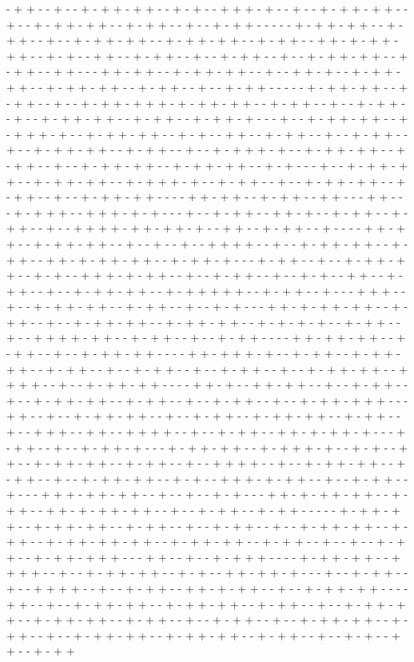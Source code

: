 - + + - - + - - + - + + - + + - - + - + - - + + + - + - - + - - + - + + - + + - - + - - + - + + - + + - - + - + + - - + - - + - + + - - - - - + - + + - + + - - + - + + - - + - - + - + + - + + - - + - + + - + + - - + - + + - - + + - + - + + - + + - - + - + - - + + - - + - + + - - + - - + - + + - - + - - + - + + - + + - - + - + + - - + + - - - + + - + + - - + - + + - + + - - + - - + + - + - - + - + + - + + - - + - + + - + + - - + - + + - - + - - + - + + - - - - - + - + + - + + - - + - + + - - + - - + - + + - + + + - + - + + - + + - - + - + + - - + - - + - + + - - + - - + - + + - + + - - + - + + - - + - + + - + - - - + - - + - + + - + + - - + - + + + - + - - + - + + - + + - - + - + - - + + - - + - + + - - + - - + - + + - - + - - + - + + - + + - - + - + + - - + - - + - + + + - + - - + - + + - + + - - + - + + - - + - - + - + + - + + - - + - + + - + + - - + - + - - - + - - + - + + - + + - - + - + + - + + - - + - + + + - + - - + - + + - - + - - + - + + - + + - - + - + + - - + - - + - + + - + + - - - - + + - + + - - + - + + - - + + - - - + + - - - + - + + + - - + + + - + - + - - - + - - + - + + - - + + - + - - + - + + - - + - + + - - + - - + + + + - + + - + + - + - - + + - - + - + + - - + - - - - + + - + + - - + - + + - + + - - + - - + - - + - - + + + + - - + - - + - + + - + + - - + - + + - - + + - + - + + - + + - - + - + + - + - - - + - + + - - + - - + - + + - + + - - + - + - - + + + - + - + + - - + - - + - + + - - + - - + - + - - + + - - + - + + - - + - - + - + + - + + - - + - + + + + + - - + - + + - - + - - - + + + - - + - - + - + + - + + - - + - + + - - + - - + - + - - - + + - + - + + - + + - - + - + + - - + - - + - + + - + + - - + - + + - + + - - + - + - + - + - - + - + + - - + - - + + + + - + + - - + - + + - - + - - + - + + - - - - + + - + + - + + - - + - + + - - + - - + - + + - + + - - - - + + - + + + - + - - + - + + - - + - + + - + + - - + - + + - - + - - + - + + - - + - - + - + + - - + - - + - + + - + + - - + + + + - - + - - + - + + - + + - - - - + + - + - - + + - + + - - + - - + - + + - - + - - + - + + - + + - - + - + + - - + - - + - + + - - + - - + - + + - + + + - - - + + - - + - - + - + + - + + - - + - - + - + + - - + - + + - + + - - + - + + - - + - - + + + - - + + - - + + + + - - + - - + - + + - - + + - + - + + - + - - - + - + + - - + - - + - + + - + - - - + - + + - + + - - + - + + + - + - - + - + - - + + - - + - + + - + + - - + - + + - - + - - + + + + - - + - - + - + + - + + - - + - + + - - + - - + - + + - + + - - + - + - - + + + - + - + + - - + - - + - + + - - + - - - + + + - + + - + + - - + - - + - - + - + - - - + + - + - + + - + + - - + - + + - - + + - + - + + - + + - - + - - + - + + - - + - + + - - - - - + - + + - + + - - + - + + - + + - - + - + + - - + - - + - + + - - + - - + - + + - + + - - + - + + - - + - + + - + + - + + - - + - + + - + + - - + - + + - - + - - + - - + - + + - - + - + + - + + + - - - + + - - + - - + - + + + - - - - + - + + - + + - - + + + + - - + - - + - + + - + + - - + - + - - + + - + + - + - - - + - - + - + + - - + - - + + + + - - + - - + - + + - - + + - + - + + - - + - - + - + + - + + - - - - + + - - + - - + - + + - + + - - + - + + - + + - - + - + + - - + - - + - + + - + + - - + - + + - + + - - + - + + - - + - - + - + + - - + - - + - + + - + + - - + - + + - - + - - + - + + - + + - - + - + + - + + - - + - + + - - + - - + - + - - + + - - + - + + 